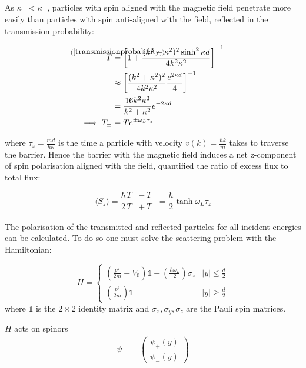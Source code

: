 \documentclass{article}
\begin{document}
\noindent As $\kappa_{+} < \kappa_{-}$, particles with spin aligned with the magnetic field penetrate more easily than particles with spin anti-aligned with the field, reflected in the transmission probability:

\begin{align}
	T &\stackrel{\mathclap{(\ref{transmissionprobability})}}{=} \left[1+\frac{(k^2+\kappa^2)^2\sinh^2{\kappa d}}{4k^2\kappa^2}\right]^{-1}\\
	  &\approx \left[\frac{(k^2+\kappa^2)^2}{4k^2\kappa^2}\frac{e^{2\kappa d}}{4}\right]^{-1} \\
	&= \frac{16k^2\kappa^2}{k^2+\kappa^2}e^{-2\kappa d} \\
	\implies T_{\pm} &= Te^{\pm\omega_L \tau_z} 
\end{align}

\noindent where $\tau_z = \frac{md}{\hbar\kappa}$ is the time a particle with velocity $v(k) = \frac{\hbar k}{m}$ takes to traverse the barrier. Hence the barrier with the magnetic field induces a net z-component of spin polarisation aligned with the field, quantified the ratio of excess flux to total flux:

\begin{equation}
	\langle S_z \rangle = \frac{\hbar}{2}\frac{T_{+}-T_{-}}{T_{+}+T_{-}} = \frac{\hbar}{2}\tanh{\omega_L\tau_z}
\end{equation}

\noindent The polarisation of the transmitted and reflected particles for all incident energies can be calculated. To do so one must solve the scattering problem with the Hamiltonian:

\begin{equation}
	H = 
	\begin{cases}
	\left(\frac{p^2}{2m} + V_0\right)\mathbb{1}-\left(\frac{\hbar \omega_L}{2}\right) \sigma_z & |y| \leq \frac{d}{2}\\
	\left(\frac{p^2}{2m}\right)\mathbb{1} & |y| \geq \frac{d}{2}
	\end{cases}
	\end{equation}
where $\mathbb{1}$ is the $2 \times 2$ identity matrix and $\sigma_{x}, \sigma_{y}, \sigma_{z}$ are the Pauli spin matrices.

\noindent $H$ acts on spinors
\begin{align}
	\psi &= \begin{pmatrix}
		\psi_{+}(y) \\
		\psi_{-}(y)
		\end{pmatrix}
\end{align}
\end{document}
